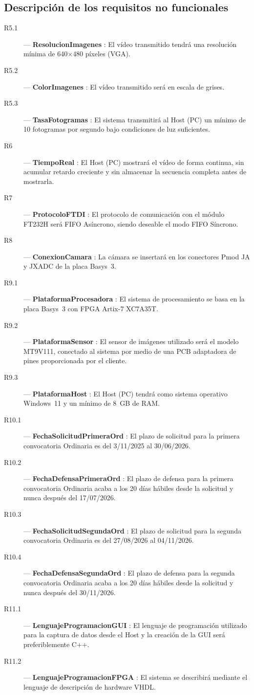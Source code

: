 \documentclass[../main.tex]{subfiles}
\begin{document}
\subsection{Descripción de los requisitos no funcionales}
\label{subsec:req_no_funcionales}

\begin{description}
    \item[R5.1] --- \textbf{ResolucionImagenes} : El vídeo transmitido tendrá una resolución mínima de 640$\times$480 píxeles (VGA).
    \item[R5.2] --- \textbf{ColorImagenes} : El vídeo transmitido será en escala de grises.
    \item[R5.3] --- \textbf{TasaFotogramas} : El sistema transmitirá al Host (PC) un mínimo de 10 fotogramas por segundo bajo condiciones de luz suficientes.
    \item[R6] --- \textbf{TiempoReal} : El Host (PC) mostrará el vídeo de forma continua, sin acumular retardo creciente y sin almacenar la secuencia completa antes de mostrarla.
    \item[R7] --- \textbf{ProtocoloFTDI} : El protocolo de comunicación con el módulo FT232H será FIFO Asíncrono, siendo deseable el modo FIFO Síncrono.
    \item[R8] --- \textbf{ConexionCamara} : La cámara se insertará en los conectores Pmod JA y JXADC de la placa Basys~3.
    \item[R9.1] --- \textbf{PlataformaProcesadora} : El sistema de procesamiento se basa en la placa Basys~3 con FPGA Artix-7 XC7A35T.
    \item[R9.2] --- \textbf{PlataformaSensor} : El sensor de imágenes utilizado será el modelo MT9V111, conectado al sistema por medio de una PCB adaptadora de pines proporcionada por el cliente.
    \item[R9.3] --- \textbf{PlataformaHost} : El Host (PC) tendrá como sistema operativo Windows~11 y un mínimo de 8~GB de RAM.
    \item[R10.1] --- \textbf{FechaSolicitudPrimeraOrd} : El plazo de solicitud para la primera convocatoria Ordinaria es del 3/11/2025 al 30/06/2026.
    \item[R10.2] --- \textbf{FechaDefensaPrimeraOrd} : El plazo de defensa para la primera convocatoria Ordinaria acaba a los 20 días hábiles desde la solicitud y nunca después del 17/07/2026.
    \item[R10.3] --- \textbf{FechaSolicitudSegundaOrd} : El plazo de solicitud para la segunda convocatoria Ordinaria es del 27/08/2026 al 04/11/2026.
    \item[R10.4] --- \textbf{FechaDefensaSegundaOrd} : El plazo de defensa para la segunda convocatoria Ordinaria acaba a los 20 días hábiles desde la solicitud y nunca después del 30/11/2026.
    \item[R11.1] --- \textbf{LenguajeProgramacionGUI} : El lenguaje de programación utilizado para la captura de datos desde el Host y la creación de la GUI será preferiblemente C++.
    \item[R11.2] --- \textbf{LenguajeProgramacionFPGA} : El sistema se describirá mediante el lenguaje de descripción de hardware VHDL.
\end{description}
\end{document}
